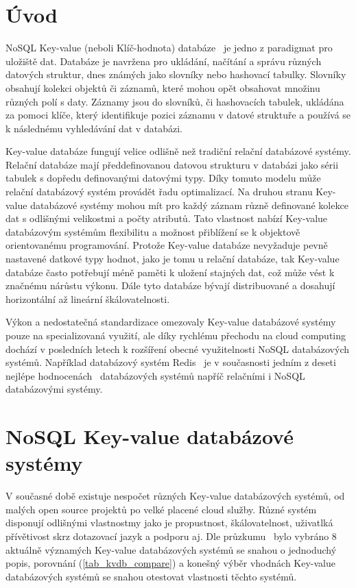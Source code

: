 \documentclass[czech,bachelor,dept460,male,csharp,cpdeclaration]{diploma}
\begin{document}
	
	\MakeTitlePages
	
	\chapter{Úvod}
	
	NoSQL Key-value (neboli Klíč-hodnota) databáze~\cite{wiki-key-value-db} je jedno z paradigmat pro uložiště dat. Databáze je navržena pro ukládání, načítání a správu různých datových struktur, dnes známých jako slovníky nebo hashovací tabulky. Slovníky obsahují kolekci objektů či záznamů, které mohou opět obsahovat množinu různých polí s daty. Záznamy jsou do slovníků, či hashovacích tabulek, ukládána za pomoci klíče, který identifikuje pozici záznamu v datové struktuře a používá se k následnému vyhledávání dat v databázi.
	
	Key-value databáze fungují velice odlišně než tradiční relační databázové systémy. Relační databáze mají předdefinovanou datovou strukturu v databázi jako sérii tabulek s dopředu definovanými datovými typy. Díky tomuto modelu může relační databázový systém provádět řadu optimalizací. Na druhou stranu Key-value databázové systémy mohou mít pro každý záznam různě definované kolekce dat s odlišnými velikostmi a počty atributů. Tato vlastnost nabízí Key-value databázovým systémům flexibilitu a možnost přiblížení se k objektově orientovanému programování. Protože Key-value databáze nevyžaduje pevně nastavené datkové typy hodnot, jako je tomu u relační databáze, tak Key-value databáze často potřebují méně paměti k uložení stajných dat, což může vést k značnému nárůstu výkonu. Dále tyto databáze bývají distribuované a dosahují horizontální až lineární škálovatelnosti.
	
	Výkon a nedostatečná standardizace omezovaly Key-value databázové systémy pouze na specializovaná využití, ale díky rychlému přechodu na cloud computing dochází v posledních letech k rozšíření obecné využitelnosti NoSQL databázových systémů. Například databázový systém Redis~\cite{redis} je v současnosti jedním z deseti nejlépe hodnocenách~\cite{db-engineers-ranking} databázových systémů napříč relačními i NoSQL databázovými systémy.
	
	\chapter{NoSQL Key-value databázové systémy}
	
	V současné době existuje nespočet různých Key-value databázových systémů, od malých open source projektů po velké placené cloud služby. Různé systém disponují odlišnými vlastnostmy jako je propustnost, škálovatelnost, uživatlká přívětivost skrz dotazovací jazyk a podporu aj. Dle průzkumu~\cite{predictiveanalyticstoday,g2,db-engineers-ranking} bylo vybráno 8 aktuálně významých Key-value databázových systémů se snahou o jednoduchý popis, porovnání (\ref{tab_kvdb_compare}) a konešný výběr vhodnách Key-value databázových systémů se snahou otestovat vlastnosti těchto systémů.
	
\end{document}
